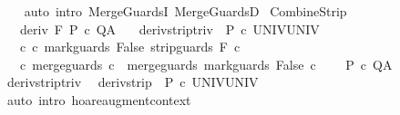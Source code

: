 \begin{isabellebody}
%
\isadelimproof
\ \ %
\endisadelimproof
%
\isatagproof
{}\isamarkupfalse%
\ {\isacharparenleft}auto\ intro{\isacharcolon}\ MergeGuardsI\ MergeGuardsD{\isacharparenright}%
\endisatagproof
{\isafoldproof}%
%
\isadelimproof
\isanewline
%
\endisadelimproof
\isanewline
{}\isamarkupfalse%
\ CombineStrip{\isacharprime}{\isacharcolon}\ \isanewline
\ \ \ deriv{\isacharcolon}\ {\isachardoublequoteopen}{\isasymGamma}{\isacharcomma}{\isasymTheta}{\isasymturnstile}\isactrlbsub {\isacharslash}F\isactrlesub \ P\ c{\isacharprime}\ Q{\isacharcomma}A{\isachardoublequoteclose}\isanewline
\ \ \ deriv{\isacharunderscore}strip{\isacharunderscore}triv{\isacharcolon}\ {\isachardoublequoteopen}{\isasymGamma}{\isacharcomma}{\isacharbraceleft}{\isacharbraceright}{\isasymturnstile}\isactrlbsub {\isacharslash}{\isacharbraceleft}{\isacharbraceright}\isactrlesub \ P\ c{\isacharprime}{\isacharprime}\ UNIV{\isacharcomma}UNIV{\isachardoublequoteclose}\isanewline
\ \ \ c{\isacharprime}{\isacharprime}{\isacharcolon}\ {\isachardoublequoteopen}c{\isacharprime}{\isacharprime}{\isacharequal}\ mark{\isacharunderscore}guards\ False\ {\isacharparenleft}strip{\isacharunderscore}guards\ {\isacharparenleft}{\isacharminus}F{\isacharparenright}\ c{\isacharprime}{\isacharparenright}{\isachardoublequoteclose}\isanewline
\ \ \ c{\isacharcolon}\ {\isachardoublequoteopen}merge{\isacharunderscore}guards\ c\ {\isacharequal}\ merge{\isacharunderscore}guards\ {\isacharparenleft}mark{\isacharunderscore}guards\ False\ c{\isacharprime}{\isacharparenright}{\isachardoublequoteclose}\isanewline
\ \ \ {\isachardoublequoteopen}{\isasymGamma}{\isacharcomma}{\isasymTheta}{\isasymturnstile}\isactrlbsub {\isacharslash}{\isacharbraceleft}{\isacharbraceright}\isactrlesub \ P\ c\ Q{\isacharcomma}A{\isachardoublequoteclose}\isanewline
%
\isadelimproof
%
\endisadelimproof
%
\isatagproof
{}\isamarkupfalse%
\ {\isacharminus}\isanewline
\ \ \isamarkupfalse%
\ deriv{\isacharunderscore}strip{\isacharunderscore}triv\ \isamarkupfalse%
\ deriv{\isacharunderscore}strip{\isacharcolon}\ {\isachardoublequoteopen}{\isasymGamma}{\isacharcomma}{\isasymTheta}{\isasymturnstile}\isactrlbsub {\isacharslash}{\isacharbraceleft}{\isacharbraceright}\isactrlesub \ P\ c{\isacharprime}{\isacharprime}\ UNIV{\isacharcomma}UNIV{\isachardoublequoteclose}\isanewline
\ \ \ \ \isamarkupfalse%
\ {\isacharparenleft}auto\ intro{\isacharcolon}\ hoare{\isacharunderscore}augment{\isacharunderscore}context{\isacharparenright}\isanewline

\end{isabellebody}
